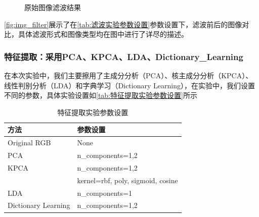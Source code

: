\documentclass[12pt,hyperref,a4paper,UTF8]{ctexart}
\begin{document}
\begin{figure}[htbp]
{}
\caption{原始图像滤波结果}
\label{fig:img_filter}
\end{figure}

\par

\autoref{fig:img_filter}展示了在\autoref{tab:滤波实验参数设置}参数设置下，滤波前后的图像对比，具体滤波形式和图像类型均在图中进行了详尽的描述。


\subsubsection{特征提取：采用PCA、KPCA、LDA、Dictionary\_Learning}
在本次实验中，我们主要擦用了主成分分析（PCA）、核主成分分析（KPCA）、线性判别分析（LDA）和字典学习（Dictionary Learning），在实验中，我们设置不同的参数，具体实验设置如\autoref{tab:特征提取实验参数设置}所示

\begin{table}[!htbp]

\caption{特征提取实验参数设置}
    \centering
    \begin{tabular}{ll}
    \hline
        \textbf{方法} & \textbf{参数设置} \\
        \hline
        Original RGB & None \\
        
        PCA  & n\_components=1,2 \\
        
        KPCA & n\_components=1,2 \\
          & kernel=rbf, poly, sigmoid, cosine \\
          
        LDA  & n\_components=1 \\
        
        Dictionary Learning  & n\_components=1,2 \\
        \hline
    \end{tabular}
    \label{tab:特征提取实验参数设置}
\end{table}
\end{document}
